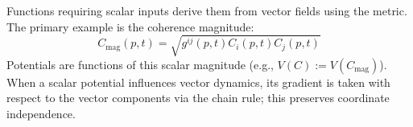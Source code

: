 Functions requiring scalar inputs derive them from vector fields using the metric. The primary example is the coherence magnitude:
\begin{equation}
C_{\mathrm{mag}}(p,t) = \sqrt{g^{ij}(p,t) C_i(p,t) C_j(p,t)}
\end{equation}
Potentials are functions of this scalar magnitude (e.g., \(V(C) := V(C_{\mathrm{mag}})\)). When a scalar potential influences vector dynamics, its gradient is taken with respect to the vector components via the chain rule; this preserves coordinate independence. 